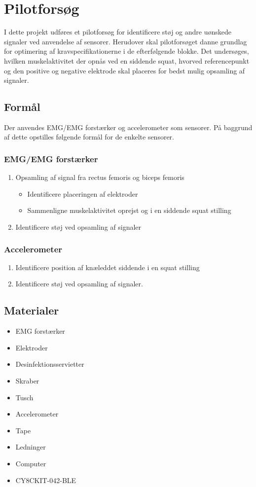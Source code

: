 \section{Pilotforsøg}
I dette projekt udføres et pilotforsøg for identificere støj og andre uønskede signaler ved anvendelse af sensorer. Herudover skal pilotforsøget danne grundlag for optimering af kravspecifikationerne i de efterfølgende blokke. Det undersøges, hvilken muskelaktivitet der opnås ved en siddende squat, hvorved referencepunkt og den positive og negative elektrode skal placeres for bedst mulig opsamling af signaler. 

\subsection{Formål}
Der anvendes EMG/EMG forstærker og accelerometer som sensorer. På baggrund af dette opstilles følgende formål for de enkelte sensorer.  

\subsubsection{EMG/EMG forstærker}
\begin{enumerate}
\item Opsamling af signal fra rectus femoris og biceps femoris
\begin{itemize}
\item Identificere placeringen af elektroder
\item Sammenligne muskelaktivitet oprejst og i en siddende squat stilling
\end{itemize}
\item Identificere støj ved opsamling af signaler
\end{enumerate}


\subsubsection{Accelerometer}
\begin{enumerate}
\item Identificere position af knæleddet siddende i en squat stilling
\item Identificere støj ved opsamling af signaler.
\end{enumerate}


\subsection{Materialer}
\begin{itemize}
\item EMG forstærker
\item Elektroder
\item Desinfektionsservietter
\item Skraber
\item Tusch 

\item Accelerometer
\item Tape
\item Ledninger

\item Computer
\item CY8CKIT-042-BLE
\end{itemize}

